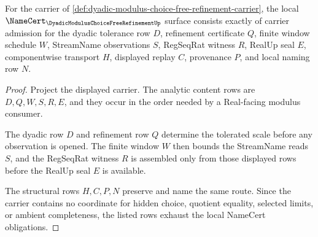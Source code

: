 \begin{theorem}
\label{thm:dyadic-modulus-choice-free-refinement-obligations}
For the carrier of \autoref{def:dyadic-modulus-choice-free-refinement-carrier}, the local $\NameCert_{\DyadicModulusChoiceFreeRefinementUp}$ surface consists exactly of carrier admission for the dyadic tolerance row $D$, refinement certificate $Q$, finite window schedule $W$, StreamName observations $S$, RegSeqRat witness $R$, RealUp seal $E$, componentwise transport $H$, displayed replay $C$, provenance $P$, and local naming row $N$.
\end{theorem}
\begin{proof}
Project the displayed carrier. The analytic content rows are $D,Q,W,S,R,E$, and they occur in the order needed by a Real-facing modulus consumer.

The dyadic row $D$ and refinement row $Q$ determine the tolerated scale before any observation is opened. The finite window $W$ then bounds the StreamName reads $S$, and the RegSeqRat witness $R$ is assembled only from those displayed rows before the RealUp seal $E$ is available.

The structural rows $H,C,P,N$ preserve and name the same route. Since the carrier contains no coordinate for hidden choice, quotient equality, selected limits, or ambient completeness, the listed rows exhaust the local NameCert obligations.
\end{proof}

